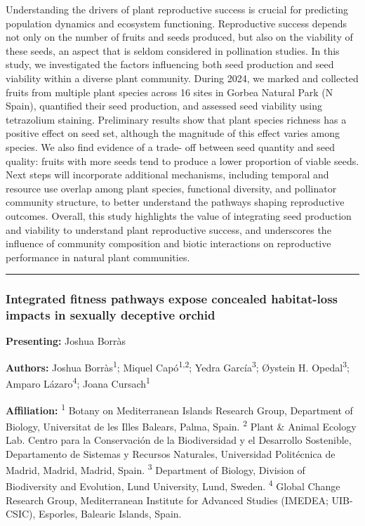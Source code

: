 \documentclass[
  letterpaper,
  DIV=11,
  numbers=noendperiod]{scrartcl}
\begin{document}
Understanding the drivers of plant reproductive success is crucial for
predicting population dynamics and ecosystem functioning. Reproductive
success depends not only on the number of fruits and seeds produced, but
also on the viability of these seeds, an aspect that is seldom
considered in pollination studies. In this study, we investigated the
factors influencing both seed production and seed viability within a
diverse plant community. During 2024, we marked and collected fruits
from multiple plant species across 16 sites in Gorbea Natural Park (N
Spain), quantified their seed production, and assessed seed viability
using tetrazolium staining. Preliminary results show that plant species
richness has a positive effect on seed set, although the magnitude of
this effect varies among species. We also find evidence of a trade- off
between seed quantity and seed quality: fruits with more seeds tend to
produce a lower proportion of viable seeds. Next steps will incorporate
additional mechanisms, including temporal and resource use overlap among
plant species, functional diversity, and pollinator community structure,
to better understand the pathways shaping reproductive outcomes.
Overall, this study highlights the value of integrating seed production
and viability to understand plant reproductive success, and underscores
the influence of community composition and biotic interactions on
reproductive performance in natural plant communities.

\begin{center}\rule{0.5\linewidth}{0.5pt}\end{center}

\subsubsection{Integrated fitness pathways expose concealed habitat-loss
impacts in sexually deceptive
orchid}\label{integrated-fitness-pathways-expose-concealed-habitat-loss-impacts-in-sexually-deceptive-orchid}

\textbf{Presenting:} Joshua Borràs

\textbf{Authors:} Joshua Borràs\textsuperscript{1}; Miquel
Capó\textsuperscript{1,2}; Yedra García\textsuperscript{3}; Øystein H.
Opedal\textsuperscript{3}; Amparo Lázaro\textsuperscript{4}; Joana
Cursach\textsuperscript{1}

\textbf{Affiliation:} \textsuperscript{1} Botany on Mediterranean
Islands Research Group, Department of Biology, Universitat de les Illes
Balears, Palma, Spain. \textsuperscript{2} Plant \& Animal Ecology Lab.
Centro para la Conservación de la Biodiversidad y el Desarrollo
Sostenible, Departamento de Sistemas y Recursos Naturales, Universidad
Politécnica de Madrid, Madrid, Madrid, Spain. \textsuperscript{3}
Department of Biology, Division of Biodiversity and Evolution, Lund
University, Lund, Sweden. \textsuperscript{4} Global Change Research
Group, Mediterranean Institute for Advanced Studies (IMEDEA; UIB-CSIC),
Esporles, Balearic Islands, Spain.
\end{document}
